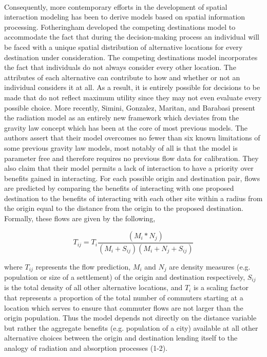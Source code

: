 \documentclass[12pt,a4paper]{thesis}
\begin{document}
\paragraph{}	
Consequently, more contemporary efforts in the development of spatial interaction modeling has been to derive models based on spatial information processing. Fotheringham \citeyearpar{Fot83} developed the competing destinations model to accommodate the fact that during the decision-making process an individual will be faced with a unique spatial distribution of alternative locations for every destination under consideration. The competing destinations model incorporates the fact that individuals do not always consider every other location. The attributes of each alternative can contribute to how and whether or not an individual considers it at all. As a result, it is entirely possible for decisions to be made that do not reflect maximum utility since they may not even evaluate every possible choice. More recently, Simini, Gonzalez, Maritan, and Barabasi \citeyearpar{Bar12} present the radiation model as an entirely new framework which deviates from the gravity law concept which has been at the core of most previous models. The authors assert that their model overcomes no fewer than six known limitations of some previous gravity law models, most notably of all is that the model is parameter free and therefore requires no previous flow data for calibration. They also claim that their model permits a lack of interaction to have a priority over benefits gained in interacting. For  each possible origin and destination pair, flows are predicted by comparing the benefits of interacting with one proposed destination to the benefits of interacting with each other site within a radius from the origin equal to the distance from the origin to the proposed destination. Formally, these flows are given by the following,
			
				\begin{equation}
				T_{ij} = T_{i}\frac{(M_{i}*N_{j})}{(M_{i}+S_{ij})(M_{i}+N_{j}+S_{ij})}
				\label{eq:originalRad}
				\end{equation}
				
where $T_{ij}$ represents the flow prediction, $M_{i}$ and $N_{j}$ are density measures (e.g. population or size of a settlement) of the origin and destination respectively, $S_{ij}$ is the total density of all other alternative locations, and $T_{i}$ is a scaling factor that represents a proportion of the total number of commuters starting at a location which serves to ensure that commuter flows are not larger than the origin population.  Thus the model depends not directly on the distance variable but rather the aggregate benefits (e.g. population of a city) available at all other alternative choices between the origin and destination lending itself to the analogy of radiation and absorption processes (1-2). 
\end{document}
